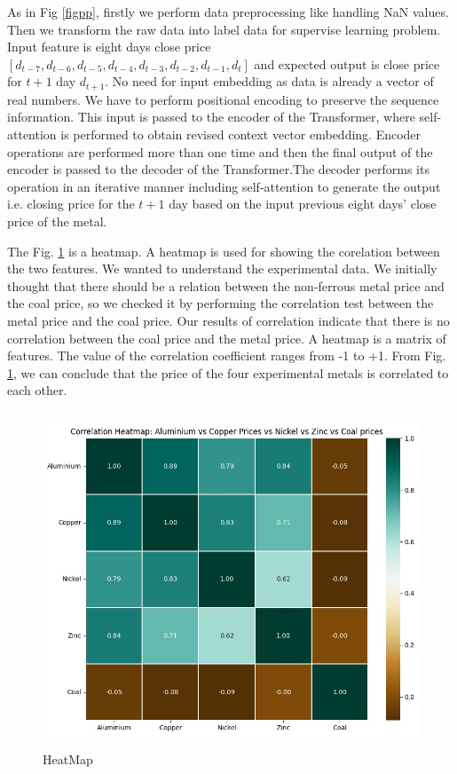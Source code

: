 \documentclass{ws-ijait}
\begin{document}
\par As in Fig \ref{figpp}, firstly we perform data preprocessing like handling NaN values. Then we transform the raw data into label data for supervise learning problem. Input feature is eight days close price $[d_{t-7},d_{t-6},d_{t-5},d_{t-4},d_{t-3},d_{t-2},d_{t-1},d_{t}]$ and expected output is close price for $t+1$ day $d_{t+1}$. No need for input embedding as data is already a vector of real numbers. We have to perform positional encoding to preserve the sequence information. This input is passed to the encoder of the Transformer, where self-attention is performed to obtain revised context vector embedding. Encoder operations are performed more than one time and then the final output of the encoder is passed to the decoder of the Transformer.The decoder performs its operation in an iterative manner including self-attention to generate the output i.e. closing price for the $t+1$ day based on the input previous eight days' close price of the metal.
\par The Fig. \ref{fighm} is a heatmap. A heatmap is used for showing the corelation between the two features. We wanted to understand the experimental data. We initially thought that there should be a relation between the non-ferrous metal price and the coal price, so we checked it by performing the correlation test between the metal price and the coal price. Our results of correlation indicate that there is no correlation between the coal price and the metal price. A heatmap is a matrix of features. The value of the correlation coefficient ranges from -1 to +1. From Fig. \ref{fighm}, we can conclude that the price of the four experimental metals is correlated to each other.

\begin{center}
	\begin{figure}[!htbp]
		\centering
		\includegraphics[width=12cm, height=10cm]{heatmap.jpeg}
		\caption{HeatMap}
		\label{fighm}
	\end{figure}
\end{center}
\end{document}
